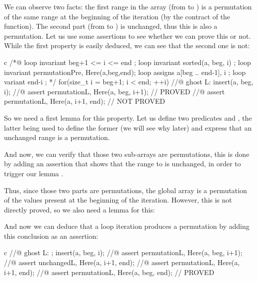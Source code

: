 We can observe two facts: the first range in the array (from  to
) is a permutation of the same range at the beginning of the
iteration (by the contract of the  function). The second part
(from  to ) is unchanged, thus this is also a
permutation. Let us use some assertions to see whether we can prove this or not.
While the first property is easily deduced, we can see that the second one is
not:



\begin{CodeBlock}{c}
  /*@
    loop invariant beg+1 <= i <= end ;
    loop invariant sorted(a, beg, i) ;
    loop invariant permutation{Pre, Here}(a,beg,end);
    loop assigns a[beg .. end-1], i ;
    loop variant end-i ;
  */
  for(size_t i = beg+1; i < end; ++i) {
    //@ ghost L:
    insert(a, beg, i);
    //@ assert permutation{L, Here}(a, beg, i+1); // PROVED
    //@ assert permutation{L, Here}(a, i+1, end); // NOT PROVED
  }
\end{CodeBlock}


So we need a first lemma for this property. Let us define two predicates
 and , the latter being used to
define the former (we will see why later) and express that an unchanged
range is a permutation.





And now, we can verify that those two sub-arrays are permutations, this is done
by adding an assertion that shows that the range  to
 is unchanged, in order to trigger our lemma
.




Thus, since those two parts are permutations, the global array is a permutation
of the values present at the beginning of the iteration. However, this is not
directly proved, so we also need a lemma for this:





And now we can deduce that a loop iteration produces a permutation by adding
this conclusion as an assertion:



\begin{CodeBlock}{c}
    //@ ghost L: ;
    insert(a, beg, i);
    //@ assert permutation{L, Here}(a, beg, i+1);
    //@ assert unchanged{L, Here}(a, i+1, end);
    //@ assert permutation{L, Here}(a, i+1, end);
    //@ assert permutation{L, Here}(a, beg, end); // PROVED
\end{CodeBlock}



